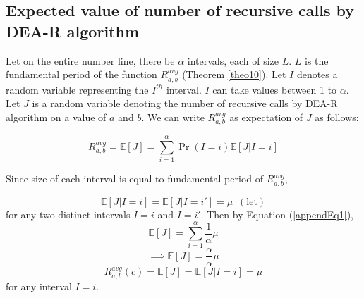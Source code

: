 \documentclass[pdflatex,sn-mathphys-num]{sn-jnl}%
\theoremstyle{thmstyleone}%
\theoremstyle{thmstyletwo}%
\theoremstyle{thmstylethree}%
\begin{document}
%




\begin{appendices}

\section{Expected value of number of recursive calls by DEA-R algorithm}\label{EVNRCDA}
Let on the entire number line, there be $\alpha$ intervals, each of size $L$. $L$ is the fundamental period of the function $R^{avg}_{a,b}$ (Theorem \ref{theo10}). Let $I$ denotes a random variable representing the $I^{th}$ interval. $I$ can take values between 1 to $\alpha$. Let $J$ is a random variable denoting the number of recursive calls by DEA-R algorithm on a value of $a$ and $b$. We can write $R^{avg}_{a,b}$ as expectation of $J$ as follows:

\begin{equation} \label{appendEq1}
 R^{avg}_{a,b}=\mathbb{E}[J]=\sum_{i=1}^{\alpha}\Pr(I=i)\mathbb{E}[J|I=i]  
\end{equation}

Since size of each interval is equal to fundamental period of $R_{a,b}^{avg}$,

$$
\mathbb{E}[J|I=i]=\mathbb{E}[J|I=i']= \mu \,\,\,(\mbox{let})
$$
for any two distinct intervals $I=i$ and $I=i'$.
Then by Equation (\ref{appendEq1}),
$$
\mathbb{E}[J]=\sum_{i=1}^{\alpha}\frac{1}{\alpha}\mu
$$
$$
\implies \mathbb{E}[J]=\frac{\alpha}{\alpha}\mu
$$
$$
 R^{avg}_{a,b}(c)=\mathbb{E}[J]=\mathbb{E}[J|I=i]=\mu
$$
for any interval $I=i$.

\end{appendices}


\end{document}
